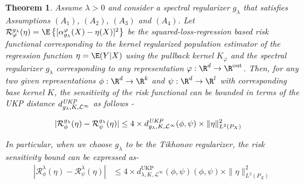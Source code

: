 \documentclass{article} %
\newcommand{\Op}{\mathcal{L}^{\infty}}
\newcommand{\rep}{\varphi}
\newcommand{\repone}{\phi}
\newcommand{\reptwo}{\psi}
\newcommand{\gl}{g_{\lambda}}
\newcommand{\LPtwo}{L^{2}(P_{X})}
\newcommand{\metricstname}{UKP }
\newcommand{\dopgl}{d_{\gl,K,\mathcal{L}^{\infty}}^{\emph{\metricstname}}}
\newcommand{\SpectralAssumptionone}{A_{1}}
\newcommand{\SpectralAssumptiontwo}{A_{2}}
\newcommand{\SpectralAssumptionthree}{A_{3}}
\newcommand{\SpectralAssumptionfour}{A_{4}}
\newcommand{\Riskrepone}{\mathcal{R}_{\repone}}
\newcommand{\Riskreptwo}{\mathcal{R}_{\reptwo}}
\newcommand{\Riskrep}{\mathcal{R}_{\rep}}
\theoremstyle{plain}
\newcounter{theoremno}
\newtheorem{theorem}[theoremno]{Theorem}
\begin{document}
\begin{theorem}\label{Risk bound}
    Assume $\lambda>0$ and consider a spectral regularizer $g_{\lambda}$ that satisfies Assumptions \hyperref[Assumption Spectral Regularizer A1]{$(\SpectralAssumptionone)$}, \hyperref[Assumption Spectral Regularizer A2]{$(\SpectralAssumptiontwo)$}, \hyperref[Assumption Spectral Regularizer A3]{$(\SpectralAssumptionthree)$} and \hyperref[Assumption Spectral Regularizer A4]{$(\SpectralAssumptionfour)$}. Let $\Riskrep^{\gl} (\eta)= \E\left\{[\alpha_{\gl}^{\rep}(X) - \eta(X)]^2\right\}$ be the squared-loss-regression based risk functional corresponding to the kernel regularized population estimator of the regression function $\eta = \E(Y | X)$ using the pullback kernel $K_{\rep}$ and the spectral regularizer $\gl$ corresponding to any representation $\rep: \R^d \to \R^\textrm{out}$. Then, for any two given representations $\repone: \R^d \to \R^k$ and $\reptwo: \R^d \to \R^l$ with corresponding base kernel $K$, the sensitivity of the risk functional can be bounded in terms of the \metricstname distance $\dopgl$ as follows - 

    \begin{equation}
        \begin{aligned}
             |\Riskrepone^{\gl} (\eta)-\Riskreptwo^{\gl}(\eta)| &\leq 4\times \dopgl (\repone,\reptwo) \times\|\eta\|_{\LPtwo}^2
        \end{aligned}
    \end{equation}

    In particular, when we choose $\gl$ to be the Tikhonov regularizer, the risk sensitivity bound can be expressed as- 
    \begin{equation}\label{risk sensitivity bound for Tikhonov regularizer}
        \begin{aligned}
             |\Riskrepone^{\lambda} (\eta)-\Riskreptwo^{\lambda}(\eta)| &\leq 4\times d_{\lambda,K, \Op}^{\text{\metricstname}}(\repone,\reptwo) (\repone,\reptwo) \times\|\eta\|_{\LPtwo}^2
        \end{aligned}
    \end{equation}
\end{theorem}
\end{document}
